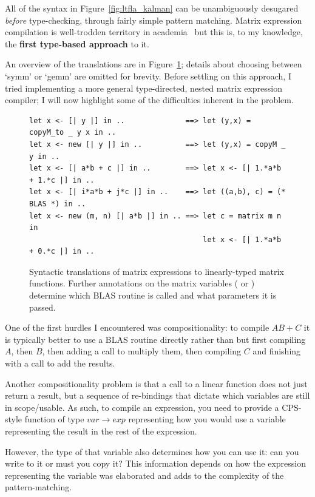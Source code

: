 All of the syntax in Figure~\ref{fig:ltfla_kalman} can be unambiguously
desugared \emph{before} type-checking, through fairly simple pattern matching.
Matrix expression compilation is well-trodden territory in
academia~\cite{rocklin_thesis, fabregat_thesis, gunnels_flame, linnea, taco}
but this is, to my knowledge, the \textbf{first type-based approach} to it.

An overview of the translations are in Figure~\ref{fig:mat_patterns}; details
about choosing between `symm' or `gemm' are omitted for brevity. Before
settling on this approach, I tried implementing a more general type-directed,
nested matrix expression compiler; I will now highlight some of the
difficulties inherent in the problem.

\begin{figure}[tp]
    \begin{verbatim}
let x <- [| y |] in ..              ==> let (y,x) = copyM_to _ y x in ..
let x <- new [| y |] in ..          ==> let (y,x) = copyM _ y in ..
let x <- [| a*b + c |] in ..        ==> let x <- [| 1.*a*b + 1.*c |] in ..
let x <- [| i*a*b + j*c |] in ..    ==> let ((a,b), c) = (* BLAS *) in ..
let x <- new (m, n) [| a*b |] in .. ==> let c = matrix m n in
                                        let x <- [| 1.*a*b + 0.*c |] in ..
    \end{verbatim}
    \caption{Syntactic translations of matrix expressions to linearly-typed
        matrix functions. Further annotations on the matrix variables
        ( or ) determine which BLAS routine is called and
        what parameters it is passed.}\label{fig:mat_patterns}

\end{figure}

One of the first hurdles I encountered was compositionality: to compile $AB +
C$ it is typically better to use a BLAS routine directly rather than but first
compiling $A$, then $B$, then adding a call to multiply them, then compiling
$C$ and finishing with a call to add the results.

Another compositionality problem is that a call to a linear function does not
just return a result, but a sequence of re-bindings that dictate which
variables are still in scope/usable.  As such, to compile an expression, you
need to provide a CPS-style function of type $var \rightarrow exp$ representing
how you would use a variable representing the result in the rest of the
expression.

However, the type of that variable also determines how you can use it: can you
write to it or must you copy it? This information depends on how the expression
representing the variable was elaborated and adds to the complexity of the
pattern-matching.

